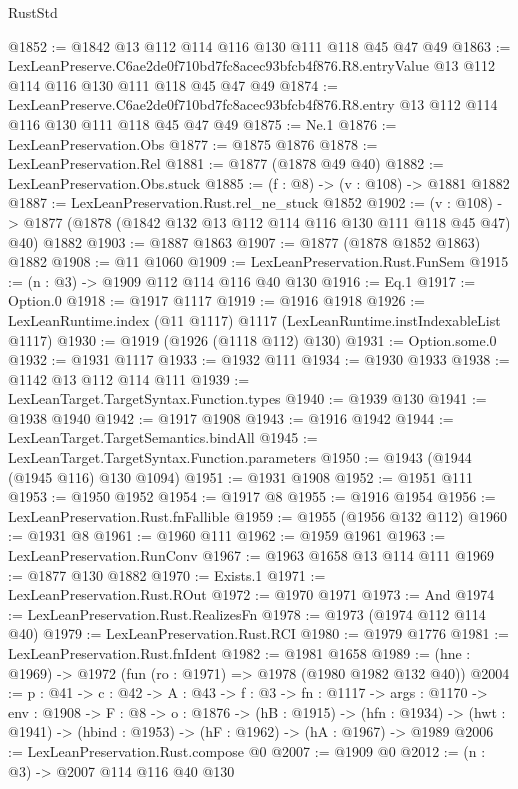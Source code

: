 \begin{lexlean}{RustStd}
\begin{coremodule}
@1852 := @1842 @13 @112 @114 @116 @130 @111 @118 @45 @47 @49
@1863 := LexLeanPreserve.C6ae2de0f710bd7fc8acec93bfcb4f876.R8.entryValue
    @13
    @112
    @114
    @116
    @130
    @111
    @118
    @45
    @47
    @49
@1874 := LexLeanPreserve.C6ae2de0f710bd7fc8acec93bfcb4f876.R8.entry
    @13
    @112
    @114
    @116
    @130
    @111
    @118
    @45
    @47
    @49
@1875 := Ne.{1}
@1876 := LexLeanPreservation.Obs
@1877 := @1875 @1876
@1878 := LexLeanPreservation.Rel
@1881 := @1877 (@1878 @49 @40)
@1882 := LexLeanPreservation.Obs.stuck
@1885 := (f : @8) -> (v : @108) -> @1881 @1882
@1887 := LexLeanPreservation.Rust.rel_ne_stuck @1852
@1902 := (v : @108) ->
  @1877 (@1878 (@1842 @132 @13 @112 @114 @116 @130 @111 @118 @45 @47) @40) @1882
@1903 := @1887 @1863
@1907 := @1877 (@1878 @1852 @1863) @1882
@1908 := @11 @1060
@1909 := LexLeanPreservation.Rust.FunSem
@1915 := (n : @3) -> @1909 @112 @114 @116 @40 @130
@1916 := Eq.{1}
@1917 := Option.{0}
@1918 := @1917 @1117
@1919 := @1916 @1918
@1926 := LexLeanRuntime.index (@11 @1117) @1117 (LexLeanRuntime.instIndexableList @1117)
@1930 := @1919 (@1926 (@1118 @112) @130)
@1931 := Option.some.{0}
@1932 := @1931 @1117
@1933 := @1932 @111
@1934 := @1930 @1933
@1938 := @1142 @13 @112 @114 @111
@1939 := LexLeanTarget.TargetSyntax.Function.types
@1940 := @1939 @130
@1941 := @1938 @1940
@1942 := @1917 @1908
@1943 := @1916 @1942
@1944 := LexLeanTarget.TargetSemantics.bindAll
@1945 := LexLeanTarget.TargetSyntax.Function.parameters
@1950 := @1943 (@1944 (@1945 @116) @130 @1094)
@1951 := @1931 @1908
@1952 := @1951 @111
@1953 := @1950 @1952
@1954 := @1917 @8
@1955 := @1916 @1954
@1956 := LexLeanPreservation.Rust.fnFallible
@1959 := @1955 (@1956 @132 @112)
@1960 := @1931 @8
@1961 := @1960 @111
@1962 := @1959 @1961
@1963 := LexLeanPreservation.RunConv
@1967 := @1963 @1658 @13 @114 @111
@1969 := @1877 @130 @1882
@1970 := Exists.{1}
@1971 := LexLeanPreservation.Rust.ROut
@1972 := @1970 @1971
@1973 := And
@1974 := LexLeanPreservation.Rust.RealizesFn
@1978 := @1973 (@1974 @112 @114 @40)
@1979 := LexLeanPreservation.Rust.RCI
@1980 := @1979 @1776
@1981 := LexLeanPreservation.Rust.fnIdent
@1982 := @1981 @1658
@1989 := (hne : @1969) -> @1972 (fun (ro : @1971) => @1978 (@1980 @1982 @132 @40))
@2004 := {p : @41} ->
  {c : @42} ->
  {A : @43} ->
  {f : @3} ->
  {fn : @1117} ->
  {args : @1170} ->
  {env : @1908} ->
  {F : @8} ->
  {o : @1876} ->
  (hB : @1915) ->
  (hfn : @1934) -> (hwt : @1941) -> (hbind : @1953) -> (hF : @1962) -> (hA : @1967) -> @1989
@2006 := LexLeanPreservation.Rust.compose @0
@2007 := @1909 @0
@2012 := (n : @3) -> @2007 @114 @116 @40 @130

\end{coremodule}
\end{lexlean}
